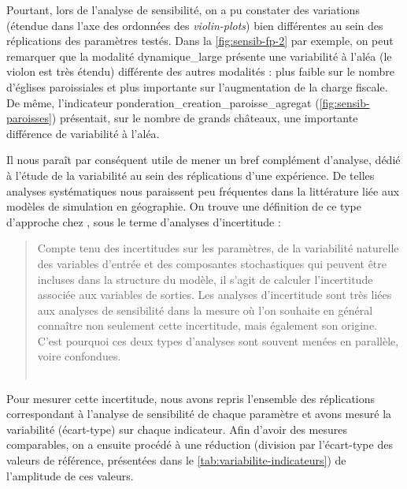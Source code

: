 Pourtant, lors de l'analyse de sensibilité, on a pu constater des variations (étendue dans l'axe des ordonnées des \textit{violin-plots}) bien différentes au sein des réplications des paramètres testés.
Dans la \cref{fig:sensib-fp-2} par exemple, on peut remarquer que la modalité \og dynamique\_large\fg{} présente une variabilité à l'aléa (le \og violon\fg{} est très étendu) différente des autres modalités : plus faible sur le nombre d'églises paroissiales et plus importante sur l'augmentation de la charge fiscale.
De même, l'indicateur \textsf{ponderation\_creation\_paroisse\_agregat} (\cref{fig:sensib-paroisses}) présentait, sur le nombre de grands châteaux, une importante différence de variabilité à l'aléa.

Il nous paraît par conséquent utile de mener un bref complément d'analyse, dédié à l'étude de la variabilité au sein des réplications d'une expérience.
De telles analyses systématiques nous paraissent peu fréquentes dans la littérature liée aux modèles de simulation en géographie.
On trouve une définition de ce type d'approche chez \textcite{ginot2005explorer}, sous le terme d'\og analyses d'incertitude\fg{} : 
\begin{quotation}
	\og Compte tenu des incertitudes sur les paramètres, de la variabilité naturelle des variables d'entrée et des composantes stochastiques qui peuvent être incluses dans la structure du modèle, il s'agit de calculer l'incertitude associée aux variables de sorties.
	Les analyses d'incertitude sont très liées aux analyses de sensibilité dans la mesure où l'on souhaite en général connaître non seulement cette incertitude, mais également son origine.
	C'est pourquoi ces deux types d'analyses sont souvent menées en parallèle, voire confondues.\fg{}\\
	\mbox{}~ \hfill \cite[76]{ginot2005explorer}
\end{quotation}

Pour mesurer cette incertitude, nous avons repris l'ensemble des réplications correspondant à l'analyse de sensibilité de chaque paramètre et avons mesuré la variabilité (écart-type) sur chaque indicateur.
Afin d'avoir des mesures comparables, on a ensuite procédé à une réduction (division par l'écart-type des valeurs de référence, présentées dans le \cref{tab:variabilite-indicateurs}) de l'amplitude de ces valeurs.


